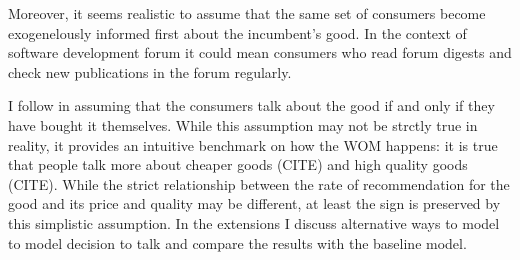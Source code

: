 \documentclass{article}
\numberwithin{figure}{section}
\numberwithin{table}{section}
\theoremstyle{indented}
\numberwithin{equation}{section} %
\begin{document}
Moreover, it seems realistic to assume that the same set of consumers become exogenelously informed first about the incumbent's good. In the context of software development forum it could mean consumers who read forum digests and check new publications in the forum regularly.

I follow \citet{Campbell2013} in assuming that the consumers talk about the good if and only if they have bought it themselves. While this assumption may not be strctly true in reality, it provides an intuitive benchmark on how the WOM happens: it is true that people talk more about cheaper goods (CITE) and high quality goods (CITE). While the strict relationship between the rate of recommendation for the good and its price and quality may be different, at least the sign is preserved by this simplistic assumption. In the extensions I discuss alternative ways to model to model decision to talk and compare the results with the baseline model.
\end{document}
